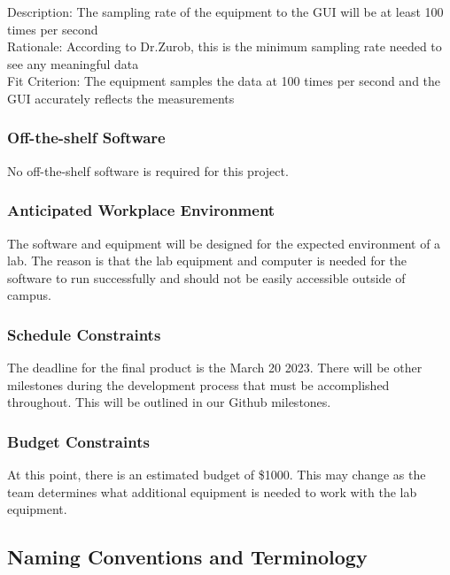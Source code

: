 \documentclass[12pt, titlepage]{article}
\begin{document}
\noindent Description: The sampling rate of the equipment to the GUI will be at least 100 times per second\\ 
Rationale: According to Dr.Zurob, this is the minimum sampling rate needed to see any meaningful data\\
Fit Criterion: The equipment samples the data at 100 times per second and the GUI accurately reflects the measurements  \\

\subsubsection{Off-the-shelf Software}
No off-the-shelf software is required for this project. 

\subsubsection{Anticipated Workplace Environment}
The software and equipment will be designed for the expected environment of a lab. The reason is that the lab equipment and computer is needed for the software to run successfully and
should not be easily accessible outside of campus. 

\subsubsection{Schedule Constraints}
The deadline for the final product is the March 20 2023. There will be other milestones during the development process that must be accomplished throughout. 
This will be outlined in our Github milestones.


\subsubsection{Budget Constraints}
At this point, there is an estimated budget of \$1000. This may change as the team determines what additional equipment is needed to work with the lab equipment.

\subsection{Naming Conventions and Terminology}
\end{document}
